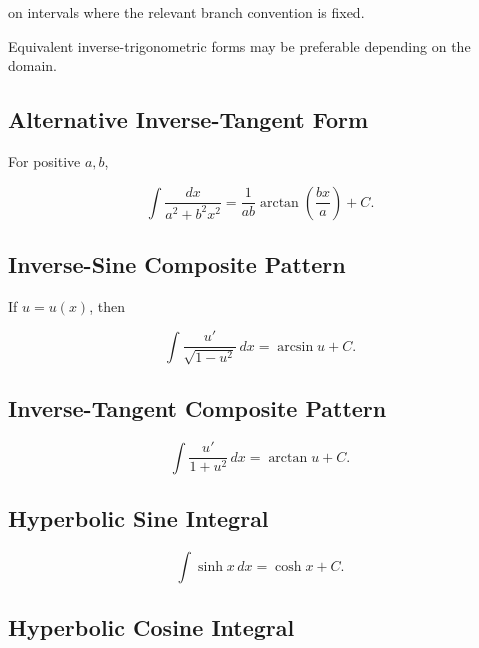 on intervals where the relevant branch convention is fixed.

Equivalent inverse-trigonometric forms may be preferable depending on the
domain.

\subsection{Alternative Inverse-Tangent Form}
\label{subsec:inverse-tangent-scaled-pattern}

For positive \(a,b\),

\[
\boxed{
\int
\frac{
dx
}{
a^2+b^2x^2
}
=
\frac{
1
}{
ab
}
\arctan
\left(
\frac{bx}{a}
\right)
+
C.
}
\]

\subsection{Inverse-Sine Composite Pattern}
\label{subsec:inverse-sine-composite-pattern}

If \(u=u(x)\), then

\[
\boxed{
\int
\frac{
u'
}{
\sqrt{1-u^2}
}
\,dx
=
\arcsin u+C.
}
\]

\subsection{Inverse-Tangent Composite Pattern}
\label{subsec:inverse-tangent-composite-pattern}

\[
\boxed{
\int
\frac{
u'
}{
1+u^2
}
\,dx
=
\arctan u+C.
}
\]

\subsection{Hyperbolic Sine Integral}
\label{subsec:sinh-integral-reference}

\[
\boxed{
\int\sinh x\,dx
=
\cosh x+C.
}
\]

\subsection{Hyperbolic Cosine Integral}
\label{subsec:cosh-integral-reference}

